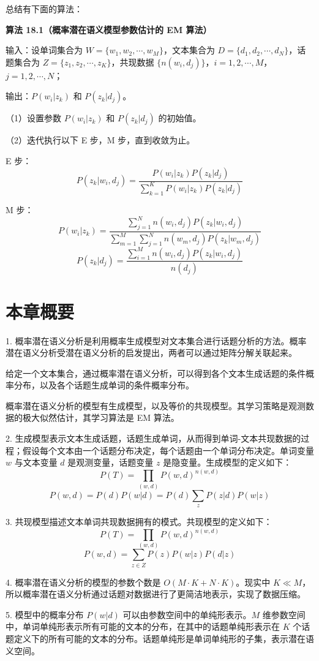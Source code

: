 \documentclass[UTF8,12pt,a4paper,fontset=fandol]{ctexart}
\begin{document}
总结有下面的算法：

\noindent\textbf{算法 18.1（概率潜在语义模型参数估计的 EM 算法）}

\noindent 输入：设单词集合为 $W=\{w_1,w_2,\cdots,w_M\}$，文本集合为 $D=\{d_1,d_2,\cdots,d_N\}$，话题集合为 $Z=\{z_1,z_2,\cdots,z_K\}$，共现数据 $\{n(w_i,d_j)\}$，$i=1,2,\cdots,M$，$j=1,2,\cdots,N$；

\noindent 输出：$P(w_i|z_k)$ 和 $P(z_k|d_j)$。

（1）设置参数 $P(w_i|z_k)$ 和 $P(z_k|d_j)$ 的初始值。

（2）迭代执行以下 E 步，M 步，直到收敛为止。

\noindent E 步：
\[
P(z_k|w_i,d_j)=
\frac{P(w_i|z_k)P(z_k|d_j)}
{\displaystyle\sum_{k=1}^{K}P(w_i|z_k)P(z_k|d_j)}
\]

\noindent M 步：
\[
P(w_i|z_k)=
\frac{\displaystyle\sum_{j=1}^{N}n(w_i,d_j)P(z_k|w_i,d_j)}
{\displaystyle\sum_{m=1}^{M}\sum_{j=1}^{N}n(w_m,d_j)P(z_k|w_m,d_j)}
\]
\[
P(z_k|d_j)=
\frac{\displaystyle\sum_{i=1}^{M}n(w_i,d_j)P(z_k|w_i,d_j)}
{n(d_j)}
\]

\section*{本章概要}

1. 概率潜在语义分析是利用概率生成模型对文本集合进行话题分析的方法。概率潜在语义分析受潜在语义分析的启发提出，两者可以通过矩阵分解关联起来。

给定一个文本集合，通过概率潜在语义分析，可以得到各个文本生成话题的条件概率分布，以及各个话题生成单词的条件概率分布。

概率潜在语义分析的模型有生成模型，以及等价的共现模型。其学习策略是观测数据的极大似然估计，其学习算法是 EM 算法。

2. 生成模型表示文本生成话题，话题生成单词，从而得到单词-文本共现数据的过程；假设每个文本由一个话题分布决定，每个话题由一个单词分布决定。单词变量 $w$ 与文本变量 $d$ 是观测变量，话题变量 $z$ 是隐变量。生成模型的定义如下：
\[
P(T)=\prod_{(w,d)}P(w,d)^{n(w,d)}
\]
\[
P(w,d)=P(d)P(w|d)=P(d)\sum_z P(z|d)P(w|z)
\]

3. 共现模型描述文本单词共现数据拥有的模式。共现模型的定义如下：
\[
P(T)=\prod_{(w,d)}P(w,d)^{n(w,d)}
\]
\[
P(w,d)=\sum_{z\in Z}P(z)P(w|z)P(d|z)
\]

4. 概率潜在语义分析的模型的参数个数是 $O(M\cdot K+N\cdot K)$。现实中 $K\ll M$，所以概率潜在语义分析通过话题对数据进行了更简洁地表示，实现了数据压缩。

5. 模型中的概率分布 $P(w|d)$ 可以由参数空间中的单纯形表示。$M$ 维参数空间中，单词单纯形表示所有可能的文本的分布，在其中的话题单纯形表示在 $K$ 个话题定义下的所有可能的文本的分布。话题单纯形是单词单纯形的子集，表示潜在语义空间。
\end{document}
